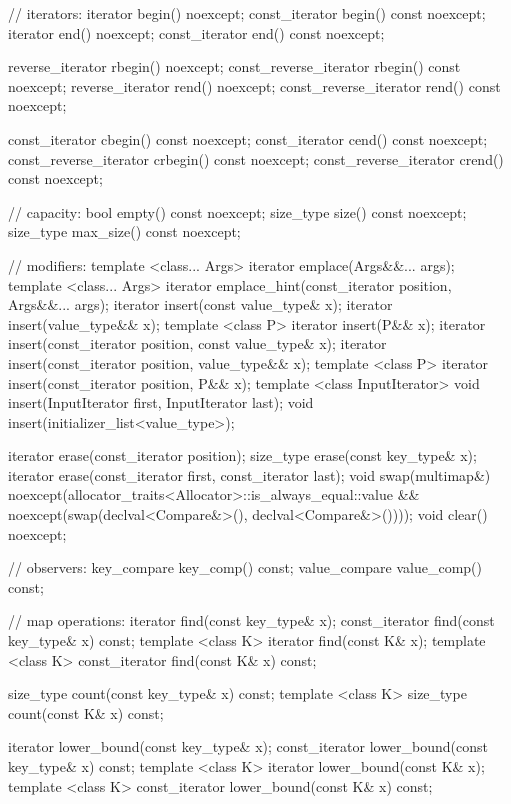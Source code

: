 \begin{codeblock}
{{    // iterators:
    iterator               begin() noexcept;
    const_iterator         begin() const noexcept;
    iterator               end() noexcept;
    const_iterator         end() const noexcept;

    reverse_iterator       rbegin() noexcept;
    const_reverse_iterator rbegin() const noexcept;
    reverse_iterator       rend() noexcept;
    const_reverse_iterator rend() const noexcept;

    const_iterator         cbegin() const noexcept;
    const_iterator         cend() const noexcept;
    const_reverse_iterator crbegin() const noexcept;
    const_reverse_iterator crend() const noexcept;

    // capacity:
    bool      empty() const noexcept;
    size_type size() const noexcept;
    size_type max_size() const noexcept;

    // modifiers:
    template <class... Args> iterator emplace(Args&&... args);
    template <class... Args> iterator emplace_hint(const_iterator position, Args&&... args);
    iterator insert(const value_type& x);
    iterator insert(value_type&& x);
    template <class P> iterator insert(P&& x);
    iterator insert(const_iterator position, const value_type& x);
    iterator insert(const_iterator position, value_type&& x);
    template <class P> iterator insert(const_iterator position, P&& x);
    template <class InputIterator>
      void insert(InputIterator first, InputIterator last);
    void insert(initializer_list<value_type>);

    iterator  erase(const_iterator position);
    size_type erase(const key_type& x);
    iterator  erase(const_iterator first, const_iterator last);
    void      swap(multimap&)
      noexcept(allocator_traits<Allocator>::is_always_equal::value &&
               noexcept(swap(declval<Compare&>(), declval<Compare&>())));
    void      clear() noexcept;

    // observers:
    key_compare key_comp() const;
    value_compare value_comp() const;

    // map operations:
    iterator       find(const key_type& x);
    const_iterator find(const key_type& x) const;
    template <class K> iterator       find(const K& x);
    template <class K> const_iterator find(const K& x) const;

    size_type      count(const key_type& x) const;
    template <class K> size_type count(const K& x) const;

    iterator       lower_bound(const key_type& x);
    const_iterator lower_bound(const key_type& x) const;
    template <class K> iterator       lower_bound(const K& x);
    template <class K> const_iterator lower_bound(const K& x) const;

}}
\end{codeblock}
